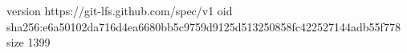 version https://git-lfs.github.com/spec/v1
oid sha256:e6a50102da716d4ea6680bb5c9759d9125d513250858fc422527144adb55f778
size 1399
